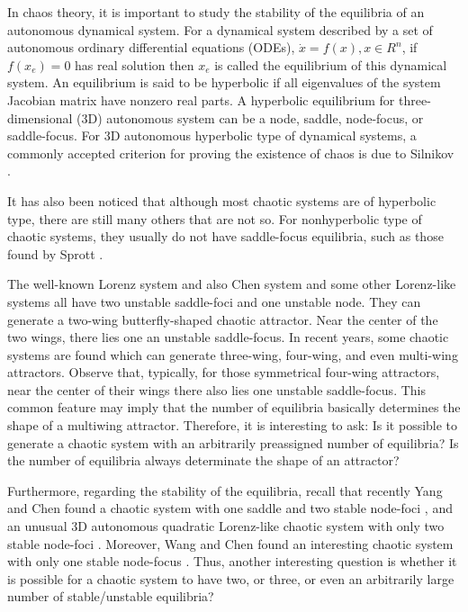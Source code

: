 In chaos theory, it is important to study the stability of the equilibria of an autonomous dynamical system.
For a dynamical system described by a set of autonomous ordinary differential equations (ODEs),
\(\dot{x} = f(x), x\in R^n\), if \(f(x_e)=0\) has real solution then \(x_e\) is called the equilibrium of this
dynamical system. An equilibrium is said to be hyperbolic if all eigenvalues of the system Jacobian matrix
have nonzero real parts. A hyperbolic equilibrium for three-dimensional (3D) autonomous system can be a node, saddle,
node-focus, or saddle-focus. For 3D autonomous hyperbolic type of dynamical systems, a commonly accepted criterion for proving
the existence of chaos is due to Silnikov \cite{Ovsyannikov1987On,L1970Sil,Shil2011Normal,Shilnikov1998Methods,BAOYING2011AN}.

It has also been noticed that although most chaotic systems are of hyperbolic type, there are still many
others that are not so. For nonhyperbolic type of chaotic systems, they usually do not have saddle-focus
equilibria, such as those found by Sprott \cite{Sprott1993Automatic,Sprott1994Some,Sprott1997Simplest,Sprott2000Algebraically}.

The well-known Lorenz system \cite{Lorenz1962Deterministic} and also Chen system \cite{AttractorYET,TETSUSHI2012BIFURCATION} and some other
Lorenz-like systems \cite{Zhou2005Š,Li2007Hopf,Li2011Dynamical,Mu2011On} all have two unstable saddle-foci and
one unstable node. They can generate a two-wing butterfly-shaped chaotic attractor. Near the center of the two wings, there lies one an unstable saddle-focus.
In recent years, some chaotic systems are found which can generate three-wing, four-wing, and even multi-wing attractors. Observe that, typically, for those
symmetrical four-wing attractors, near the center of their wings there also lies one unstable saddle-focus. This common feature may imply that the number of
equilibria basically determines the shape of a multiwing attractor. Therefore, it is interesting to ask: Is it possible to generate a chaotic system with an
arbitrarily preassigned number of equilibria? Is the number of equilibria always determinate the shape of an attractor?

Furthermore, regarding the stability of the equilibria, recall that recently Yang and Chen found a
chaotic system with one saddle and two stable node-foci \cite{QIGUI2008A}, and an unusual 3D autonomous quadratic
Lorenz-like chaotic system with only two stable node-foci \cite{QIGUI2010AN}. Moreover, Wang and Chen found
an interesting chaotic system with only one stable node-focus \cite{Wang2011A}. Thus, another interesting question is
whether it is possible for a chaotic system to have two, or three, or even an arbitrarily large number of stable/unstable equilibria?

